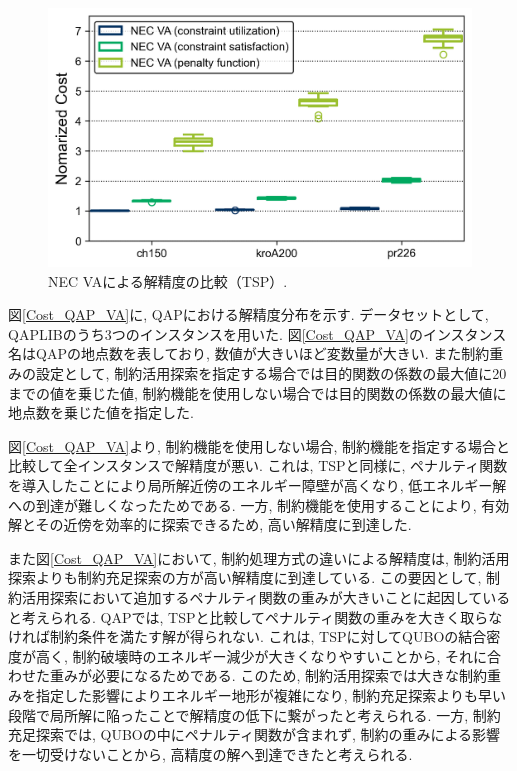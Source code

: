 \documentclass[submit,techrep,noauthor]{ipsj}
\begin{document}
\begin{figure}[tb]
\centering
\includegraphics[bb=0 0 700 230, width=15cm]{Cost_TSP_VA.png}
\caption{NEC VAによる解精度の比較（TSP）.}
\label{Cost_TSP_VA}
\end{figure}

図\ref{Cost_QAP_VA}に, QAPにおける解精度分布を示す. データセットとして, QAPLIB\cite{qaplib}のうち3つのインスタンスを用いた. 図\ref{Cost_QAP_VA}のインスタンス名はQAPの地点数を表しており, 数値が大きいほど変数量が大きい. また制約重みの設定として, 制約活用探索を指定する場合では目的関数の係数の最大値に20までの値を乗じた値, 制約機能を使用しない場合では目的関数の係数の最大値に地点数を乗じた値を指定した.

図\ref{Cost_QAP_VA}より, 制約機能を使用しない場合, 制約機能を指定する場合と比較して全インスタンスで解精度が悪い. これは, TSPと同様に, ペナルティ関数を導入したことにより局所解近傍のエネルギー障壁が高くなり, 低エネルギー解への到達が難しくなったためである. 一方, 制約機能を使用することにより, 有効解とその近傍を効率的に探索できるため, 高い解精度に到達した.

また図\ref{Cost_QAP_VA}において, 制約処理方式の違いによる解精度は, 制約活用探索よりも制約充足探索の方が高い解精度に到達している. この要因として, 制約活用探索において追加するペナルティ関数の重みが大きいことに起因していると考えられる. QAPでは, TSPと比較してペナルティ関数の重みを大きく取らなければ制約条件を満たす解が得られない. これは, TSPに対してQUBOの結合密度が高く, 制約破壊時のエネルギー減少が大きくなりやすいことから, それに合わせた重みが必要になるためである. このため, 制約活用探索では大きな制約重みを指定した影響によりエネルギー地形が複雑になり, 制約充足探索よりも早い段階で局所解に陥ったことで解精度の低下に繋がったと考えられる. 一方, 制約充足探索では, QUBOの中にペナルティ関数が含まれず, 制約の重みによる影響を一切受けないことから, 高精度の解へ到達できたと考えられる.
\end{document}
